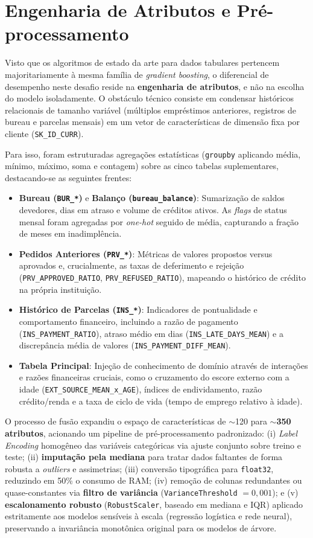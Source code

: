 \documentclass[10pt,a4paper]{article}
\begin{document}
\section{Engenharia de Atributos e Pré-processamento}
Visto que os algoritmos de estado da arte para dados tabulares pertencem majoritariamente à mesma família de \textit{gradient boosting}, o diferencial de desempenho neste desafio reside na \textbf{engenharia de atributos}, e não na escolha do modelo isoladamente. O obstáculo técnico consiste em condensar históricos relacionais de tamanho variável (múltiplos empréstimos anteriores, registros de bureau e parcelas mensais) em um vetor de características de dimensão fixa por cliente (\texttt{SK\_ID\_CURR}). 

Para isso, foram estruturadas agregações estatísticas (\texttt{groupby} aplicando média, mínimo, máximo, soma e contagem) sobre as cinco tabelas suplementares, destacando-se as seguintes frentes:
\begin{itemize}
    \item \textbf{Bureau (\texttt{BUR\_*})} e \textbf{Balanço (\texttt{bureau\_balance})}: Sumarização de saldos devedores, dias em atraso e volume de créditos ativos. As \textit{flags} de status mensal foram agregadas por \textit{one-hot} seguido de média, capturando a fração de meses em inadimplência.
    \item \textbf{Pedidos Anteriores (\texttt{PRV\_*})}: Métricas de valores propostos versus aprovados e, crucialmente, as taxas de deferimento e rejeição (\texttt{PRV\_APPROVED\_RATIO}, \texttt{PRV\_REFUSED\_RATIO}), mapeando o histórico de crédito na própria instituição.
    \item \textbf{Histórico de Parcelas (\texttt{INS\_*})}: Indicadores de pontualidade e comportamento financeiro, incluindo a razão de pagamento (\texttt{INS\_PAYMENT\_RATIO}), atraso médio em dias (\texttt{INS\_LATE\_DAYS\_MEAN}) e a discrepância média de valores (\texttt{INS\_PAYMENT\_DIFF\_MEAN}).
    \item \textbf{Tabela Principal}: Injeção de conhecimento de domínio através de interações e razões financeiras cruciais, como o cruzamento do escore externo com a idade (\texttt{EXT\_SOURCE\_MEAN\_x\_AGE}), índices de endividamento, razão crédito/renda e a taxa de ciclo de vida (tempo de emprego relativo à idade).
\end{itemize}

O processo de fusão expandiu o espaço de características de $\sim$120 para \textbf{$\sim$350 atributos}, acionando um pipeline de pré-processamento padronizado: (i) \textit{Label Encoding} homogêneo das variáveis categóricas via ajuste conjunto sobre treino e teste; (ii) \textbf{imputação pela mediana} para tratar dados faltantes de forma robusta a \textit{outliers} e assimetrias; (iii) conversão tipográfica para \texttt{float32}, reduzindo em 50\% o consumo de RAM; (iv) remoção de colunas redundantes ou quase-constantes via \textbf{filtro de variância} (\texttt{VarianceThreshold} $= 0{,}001$); e (v) \textbf{escalonamento robusto} (\texttt{RobustScaler}, baseado em mediana e IQR) aplicado estritamente aos modelos sensíveis à escala (regressão logística e rede neural), preservando a invariância monotônica original para os modelos de árvore. 
\end{document}
